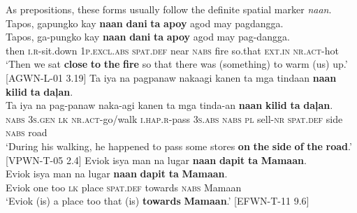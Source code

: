 As prepositions, these forms usually follow the definite spatial marker \textit{naan}.
\ea
Tapos,  gapungko  kay  \textbf{naan}  \textbf{dani}  \textbf{ta}  \textbf{apoy}  agod may  pagdangga. \\\smallskip
 \gll Tapos,  ga-pungko  kay  \textbf{naan}  \textbf{dani}  \textbf{ta}  \textbf{apoy}  agod may  pag-dangga. \\
then  \textsc{i.r}-sit.down  1\textsc{p.excl.abs}  \textsc{spat.def}  near  \textsc{nabs}  fire  so.that
\textsc{ext.in}  \textsc{nr.act}-hot \\
\glt `Then we sat \textbf{close} \textbf{to} \textbf{the} \textbf{fire} so that there was (something) to warm (us) up.’ [AGWN-L-01 3.19]
\z
\ea
Ta  iya  na  pagpanaw  nakaagi  kanen  ta  mga  tindaan \textbf{naan}  \textbf{kilid}  \textbf{ta}  \textbf{daļan}. \\\smallskip
 \gll Ta  iya  na  pag-panaw  naka-agi  kanen  ta  mga  tinda-an \textbf{naan}  \textbf{kilid}  \textbf{ta}  \textbf{daļan}. \\
\textsc{nabs}  3\textsc{s.gen}  \textsc{lk}  \textsc{nr.act}-go/walk  \textsc{i.hap.r}-pass  3\textsc{s.abs}  \textsc{nabs}  \textsc{pl}  sell-\textsc{nr}
\textsc{spat.def}  side  \textsc{nabs}  road \\
\glt `During his walking, he happened to pass some stores \textbf{on} \textbf{the} \textbf{side} \textbf{of} \textbf{the} \textbf{road}.’ [VPWN-T-05 2.4]
\z
\ea
Eviok  isya  man  na  lugar  \textbf{naan}  \textbf{dapit}  \textbf{ta}  \textbf{Mamaan}. \\\smallskip
 \gll Eviok  isya  man  na  lugar  \textbf{naan}  \textbf{dapit}  \textbf{ta}  \textbf{Mamaan}. \\
Eviok  one  too  \textsc{lk}  place  \textsc{spat.def}  towards  \textsc{nabs}  Mamaan \\
\glt ‘Eviok (is) a place too that (is) \textbf{towards} \textbf{Mamaan}.’ [EFWN-T-11 9.6]
\z

